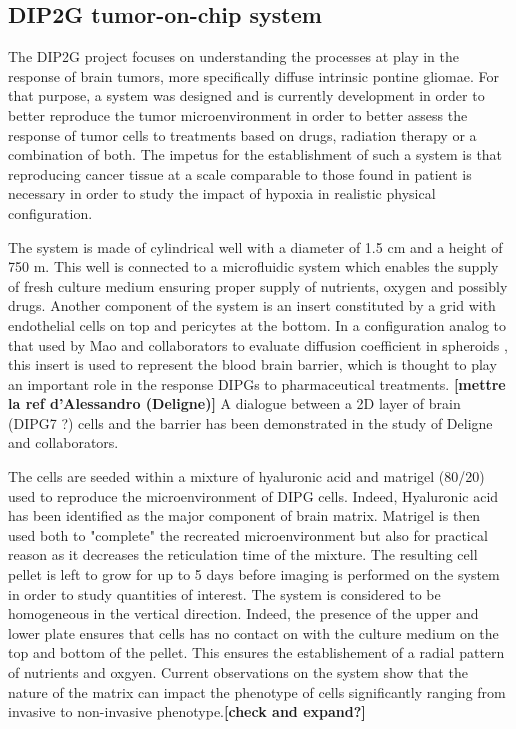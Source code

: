 \documentclass[11pt,a4paper]{article}
\begin{document}
\subsection{DIP2G tumor-on-chip system}
The DIP2G project focuses on understanding the processes at play in the response of brain tumors, more specifically diffuse intrinsic pontine gliomae. For that purpose, a system was designed and is currently development in order to better reproduce the tumor microenvironment in order to better assess the response of tumor cells to treatments based on drugs, radiation therapy or a combination of both. The impetus for the establishment of such a system is that reproducing cancer tissue at a scale comparable to those found in patient is necessary in order to study the impact of hypoxia in realistic physical configuration.

The system is made of cylindrical well with a diameter of 1.5 cm and a height of 750 \textmu m. This well is connected to a microfluidic system which enables the supply of fresh culture medium ensuring proper supply of nutrients, oxygen and possibly drugs. Another component of the system is an insert constituted by a grid with endothelial cells on top and pericytes at the bottom. In a configuration analog to that used by Mao and collaborators to evaluate diffusion coefficient in spheroids \cite{Mao2018}, this insert is used to represent the blood brain barrier, which is thought to play an important role in the response DIPGs to pharmaceutical treatments. \textbf{[mettre la ref d'Alessandro (Deligne)]} A dialogue between a 2D layer of brain (DIPG7 ?) cells and the barrier has been demonstrated in the study of Deligne and collaborators.

The cells are seeded within a mixture of hyaluronic acid and matrigel (80/20) used to reproduce the microenvironment of DIPG cells. Indeed, Hyaluronic acid has been identified as the major component of brain matrix. Matrigel is then used both to "complete" the recreated microenvironment but also for practical reason as it decreases the reticulation time of the mixture. The resulting cell pellet is left to grow for up to 5 days before imaging is performed on the system in order to study quantities of interest. The system is considered to be homogeneous in the vertical direction. Indeed, the presence of the upper and lower plate ensures that cells has no contact on with the culture medium on the top and bottom of the pellet. This ensures the establishement of a radial pattern of nutrients and oxgyen. Current observations on the system show that the nature of the matrix can impact the phenotype of cells significantly ranging from invasive to non-invasive phenotype.\textbf{[check and expand?]}
\end{document}
